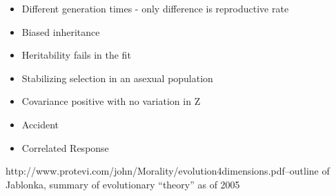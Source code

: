 \begin{itemize}
\begin{itemize}
		\item
		
		Different generation times - only difference is reproductive rate
		
		\item
		
		Biased inheritance
		
		\item
		
		Heritability fails in the fit
		
		\item
		
		Stabilizing selection in an asexual population
		
		\item
		
		Covariance positive with no variation in Z
		
		\item
		
		Accident
		
		\item
		
		Correlated Response
		
	\end{itemize}
\end{itemize}


http://www.protevi.com/john/Morality/evolution4dimensions.pdf--outline of Jablonka, summary of evolutionary ``theory'' as of 2005

